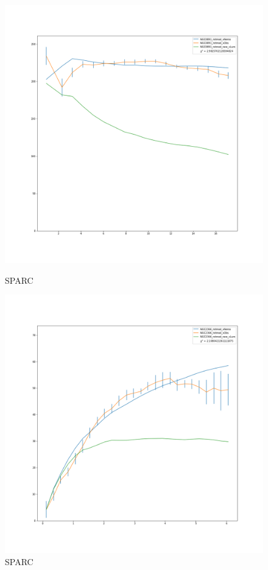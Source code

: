 \documentclass[reprint,%
 amsmath,amssymb,
 aps,
]{revtex4-1}
\begin{document}
\begin{figure} 
\centering
\begin{minipage}{0.5\textwidth}
  \includegraphics[width=.8\linewidth]{figures/NGC0891_rotmod_XueSofue.png}
\caption{ SPARC\cite{2016Lelli}}
\label{fig:0891}
\end{minipage}
\begin{minipage}{0.5\textwidth}
  \includegraphics[width=.8\linewidth]{figures/NGC2366_rotmod_XueSofue.png}
\caption{ SPARC\cite{2016Lelli}}
\label{fig:2915}
\end{minipage}
\end{figure}
\end{document}
